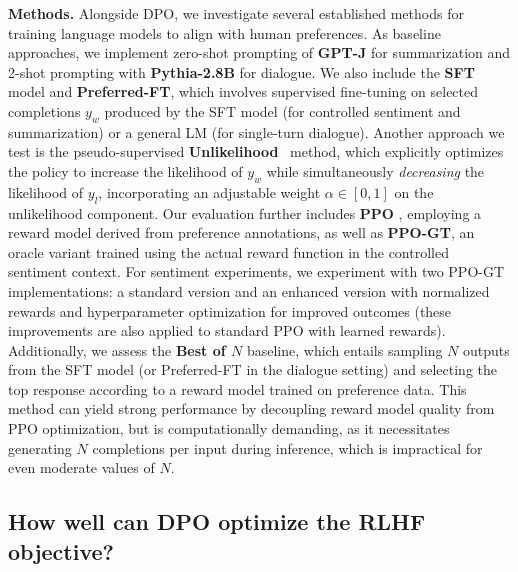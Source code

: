 \textbf{Methods.} Alongside DPO, we investigate several established methods for training language models to align with human preferences. As baseline approaches, we implement zero-shot prompting of \textbf{GPT-J} \citep{gpt-j} for summarization and 2-shot prompting with \textbf{Pythia-2.8B} \citep{biderman2023pythia} for dialogue. We also include the \textbf{SFT} model and \textbf{Preferred-FT}, which involves supervised fine-tuning on selected completions $y_w$ produced by the SFT model (for controlled sentiment and summarization) or a general LM (for single-turn dialogue). Another approach we test is the pseudo-supervised \textbf{Unlikelihood}~\citep{welleck2019neural} method, which explicitly optimizes the policy to increase the likelihood of $y_w$ while simultaneously \textit{decreasing} the likelihood of $y_l$, incorporating an adjustable weight $\alpha\in[0,1]$ on the unlikelihood component. Our evaluation further includes \textbf{PPO} \citep{schulman2017proximal}, employing a reward model derived from preference annotations, as well as \textbf{PPO-GT}, an oracle variant trained using the actual reward function in the controlled sentiment context. For sentiment experiments, we experiment with two PPO-GT implementations: a standard version \cite{leandro_von_werra_2023_7790115} and an enhanced version with normalized rewards and hyperparameter optimization for improved outcomes (these improvements are also applied to standard PPO with learned rewards). Additionally, we assess the \textbf{Best of $N$} baseline, which entails sampling $N$ outputs from the SFT model (or Preferred-FT in the dialogue setting) and selecting the top response according to a reward model trained on preference data. This method can yield strong performance by decoupling reward model quality from PPO optimization, but is computationally demanding, as it necessitates generating $N$ completions per input during inference, which is impractical for even moderate values of $N$.

\subsection{How well can DPO optimize the RLHF objective?}


